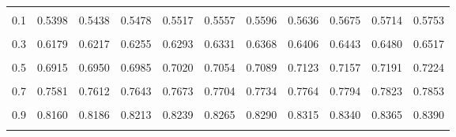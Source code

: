 \documentclass[
]{article}
\begin{document}
\begin{longtable}[l]{lcccccccccc}
\endfoot
\bottomrule
\endlastfoot
\cellcolor{gray!15}{0} & \cellcolor{gray!15}{0.5000} & \cellcolor{gray!15}{0.5040} & \cellcolor{gray!15}{0.5080} & \cellcolor{gray!15}{0.5120} & \cellcolor{gray!15}{0.5160} & \cellcolor{gray!15}{0.5199} & \cellcolor{gray!15}{0.5239} & \cellcolor{gray!15}{0.5279} & \cellcolor{gray!15}{0.5319} & \cellcolor{gray!15}{0.5359}\\
0.1 & 0.5398 & 0.5438 & 0.5478 & 0.5517 & 0.5557 & 0.5596 & 0.5636 & 0.5675 & 0.5714 & 0.5753\\
\cellcolor{gray!15}{0.2} & \cellcolor{gray!15}{0.5793} & \cellcolor{gray!15}{0.5832} & \cellcolor{gray!15}{0.5871} & \cellcolor{gray!15}{0.5910} & \cellcolor{gray!15}{0.5948} & \cellcolor{gray!15}{0.5987} & \cellcolor{gray!15}{0.6026} & \cellcolor{gray!15}{0.6064} & \cellcolor{gray!15}{0.6103} & \cellcolor{gray!15}{0.6141}\\
0.3 & 0.6179 & 0.6217 & 0.6255 & 0.6293 & 0.6331 & 0.6368 & 0.6406 & 0.6443 & 0.6480 & 0.6517\\
\cellcolor{gray!15}{0.4} & \cellcolor{gray!15}{0.6554} & \cellcolor{gray!15}{0.6591} & \cellcolor{gray!15}{0.6628} & \cellcolor{gray!15}{0.6664} & \cellcolor{gray!15}{0.6700} & \cellcolor{gray!15}{0.6737} & \cellcolor{gray!15}{0.6773} & \cellcolor{gray!15}{0.6808} & \cellcolor{gray!15}{0.6844} & \cellcolor{gray!15}{0.6879}\\
0.5 & 0.6915 & 0.6950 & 0.6985 & 0.7020 & 0.7054 & 0.7089 & 0.7123 & 0.7157 & 0.7191 & 0.7224\\
\cellcolor{gray!15}{0.6} & \cellcolor{gray!15}{0.7258} & \cellcolor{gray!15}{0.7291} & \cellcolor{gray!15}{0.7324} & \cellcolor{gray!15}{0.7357} & \cellcolor{gray!15}{0.7389} & \cellcolor{gray!15}{0.7422} & \cellcolor{gray!15}{0.7454} & \cellcolor{gray!15}{0.7486} & \cellcolor{gray!15}{0.7518} & \cellcolor{gray!15}{0.7549}\\
0.7 & 0.7581 & 0.7612 & 0.7643 & 0.7673 & 0.7704 & 0.7734 & 0.7764 & 0.7794 & 0.7823 & 0.7853\\
\cellcolor{gray!15}{0.8} & \cellcolor{gray!15}{0.7882} & \cellcolor{gray!15}{0.7911} & \cellcolor{gray!15}{0.7939} & \cellcolor{gray!15}{0.7968} & \cellcolor{gray!15}{0.7996} & \cellcolor{gray!15}{0.8024} & \cellcolor{gray!15}{0.8052} & \cellcolor{gray!15}{0.8079} & \cellcolor{gray!15}{0.8106} & \cellcolor{gray!15}{0.8133}\\
0.9 & 0.8160 & 0.8186 & 0.8213 & 0.8239 & 0.8265 & 0.8290 & 0.8315 & 0.8340 & 0.8365 & 0.8390\\
\cellcolor{gray!15}{1} & \cellcolor{gray!15}{0.8414} & \cellcolor{gray!15}{0.8438} & \cellcolor{gray!15}{0.8462} & \cellcolor{gray!15}{0.8486} & \cellcolor{gray!15}{0.8509} & \cellcolor{gray!15}{0.8532} & \cellcolor{gray!15}{0.8555} & \cellcolor{gray!15}{0.8578} & \cellcolor{gray!15}{0.8600} & \cellcolor{gray!15}{0.8622}\\

\end{longtable}
\end{document}
